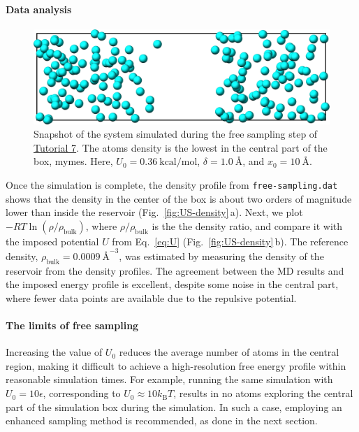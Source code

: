 \documentclass[9pt,tutorial]{livecoms}
\newcommand{\lmpcmd}[1]{\colorbox{listing}{\textcolor{command}{\small{#1}}}} %
\newcommand{\flecmd}[1]{\textcolor{command}{\texttt{#1}}} %
\begin{document}
\paragraph{Data analysis}

\begin{figure}
\centering
\includegraphics[width=\linewidth]{US-system-unbiased}
\caption{Snapshot of the system simulated during the free sampling
step of \hyperref[umbrella-sampling-label]{Tutorial 7}.
The atoms density is the lowest in the central
part of the box, \lmpcmd{mymes}.  Here,
$U_0 = 0.36~\text{kcal/mol}$, $\delta = 1.0~\text{\AA{}}$, and $x_0 = 10~\text{\AA{}}$.}
\label{fig:US-system-unbiased}
\end{figure}

Once the simulation is complete, the density profile from \flecmd{free-sampling.dat}
shows that the density in the center of the box is
about two orders of magnitude lower than inside the reservoir (Fig.~\ref{fig:US-density}\,a).
Next, we plot $-R T \ln(\rho/\rho_\mathrm{bulk})$, %
where $\rho/\rho_\mathrm{bulk}$ is the the density ratio, and compare it
with the imposed potential $U$ from Eq.~\eqref{eq:U} (Fig.~\ref{fig:US-density}\,b).
The reference density, $\rho_\text{bulk} = 0.0009~\text{\AA{}}^{-3}$,
was estimated by measuring the density of the reservoir from the density
profiles.  The agreement between the MD results and the imposed energy profile
is excellent, despite some noise in the central part, where fewer data points
are available due to the repulsive potential.

\paragraph{The limits of free sampling}

Increasing the value of $U_0$ reduces the average number of atoms in the central
region, making it difficult to achieve a high-resolution free energy profile
within reasonable simulation times.  For example, running the same
simulation with $U_0 = 10 \epsilon$, corresponding to $U_0 \approx 10 k_\text{B} T$, results in no atoms exploring
the central part of the simulation box during the simulation.
In such a case, employing an enhanced sampling method is recommended, as done in the next section.
\end{document}
